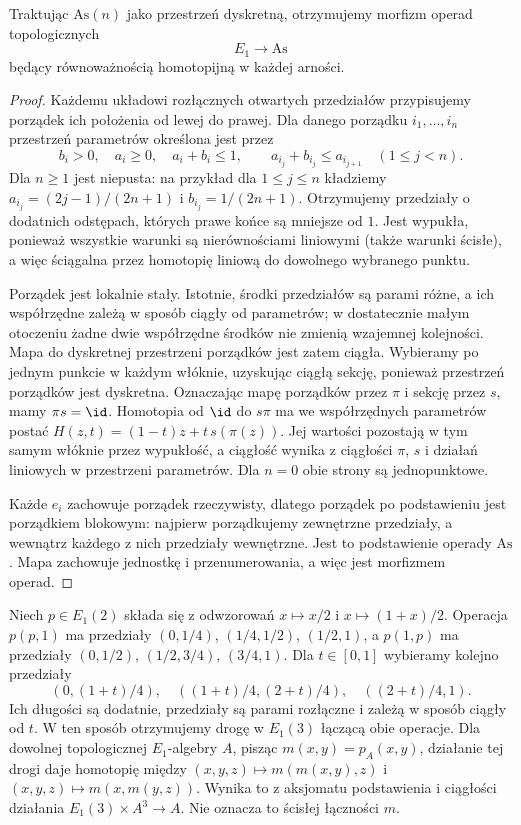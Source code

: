 \begin{twierdzenie}\label{cat:thm:little-intervals-associative}
Traktując $\mathrm{As}(n)$ jako przestrzeń dyskretną, otrzymujemy morfizm operad topologicznych
\[
 E_1\longrightarrow \mathrm{As}
\]
będący równoważnością homotopijną w każdej arności.
\end{twierdzenie}
\begin{proof}
Każdemu układowi rozłącznych otwartych przedziałów przypisujemy porządek ich położenia od lewej do prawej. Dla danego porządku $i_1,\ldots,i_n$ przestrzeń parametrów określona jest przez
\[
 b_i>0,\quad a_i\geq0,\quad a_i+b_i\leq1,\qquad
 a_{i_j}+b_{i_j}\leq a_{i_{j+1}}\quad(1\leq j<n).
\]
Dla $n\geq1$ jest niepusta: na przykład dla $1\leq j\leq n$ kładziemy $a_{i_j}=(2j-1)/(2n+1)$ i $b_{i_j}=1/(2n+1)$. Otrzymujemy przedziały o dodatnich odstępach, których prawe końce są mniejsze od $1$. Jest wypukła, ponieważ wszystkie warunki są nierównościami liniowymi (także warunki ścisłe), a więc ściągalna przez homotopię liniową do dowolnego wybranego punktu.

Porządek jest lokalnie stały. Istotnie, środki przedziałów są parami różne, a ich współrzędne zależą w sposób ciągły od parametrów; w dostatecznie małym otoczeniu żadne dwie współrzędne środków nie zmienią wzajemnej kolejności. Mapa do dyskretnej przestrzeni porządków jest zatem ciągła. Wybieramy po jednym punkcie w każdym włóknie, uzyskując ciągłą sekcję, ponieważ przestrzeń porządków jest dyskretna. Oznaczając mapę porządków przez $\pi$ i sekcję przez $s$, mamy $\pi s=\id$. Homotopia od $\id$ do $s\pi$ ma we współrzędnych parametrów postać $H(z,t)=(1-t)z+t\,s(\pi(z))$. Jej wartości pozostają w tym samym włóknie przez wypukłość, a ciągłość wynika z ciągłości $\pi$, $s$ i działań liniowych w przestrzeni parametrów. Dla $n=0$ obie strony są jednopunktowe.

Każde $e_i$ zachowuje porządek rzeczywisty, dlatego porządek po podstawieniu jest porządkiem blokowym: najpierw porządkujemy zewnętrzne przedziały, a wewnątrz każdego z nich przedziały wewnętrzne. Jest to podstawienie operady $\mathrm{As}$. Mapa zachowuje jednostkę i przenumerowania, a więc jest morfizmem operad.
\end{proof}
\begin{przyklad}\label{cat:ex:little-intervals-associativity}
Niech $p\in E_1(2)$ składa się z odwzorowań $x\mapsto x/2$ i $x\mapsto (1+x)/2$. Operacja $p(p,1)$ ma przedziały $(0,1/4)$, $(1/4,1/2)$, $(1/2,1)$, a $p(1,p)$ ma przedziały $(0,1/2)$, $(1/2,3/4)$, $(3/4,1)$. Dla $t\in[0,1]$ wybieramy kolejno przedziały
\[
 (0,(1+t)/4),\quad ((1+t)/4,(2+t)/4),\quad ((2+t)/4,1).
\]
Ich długości są dodatnie, przedziały są parami rozłączne i zależą w sposób ciągły od $t$. W ten sposób otrzymujemy drogę w $E_1(3)$ łączącą obie operacje. Dla dowolnej topologicznej $E_1$-algebry $A$, pisząc $m(x,y)=p_A(x,y)$, działanie tej drogi daje homotopię między $(x,y,z)\mapsto m(m(x,y),z)$ i $(x,y,z)\mapsto m(x,m(y,z))$. Wynika to z aksjomatu podstawienia i ciągłości działania $E_1(3)\times A^3\to A$. Nie oznacza to ścisłej łączności $m$.
\end{przyklad}

